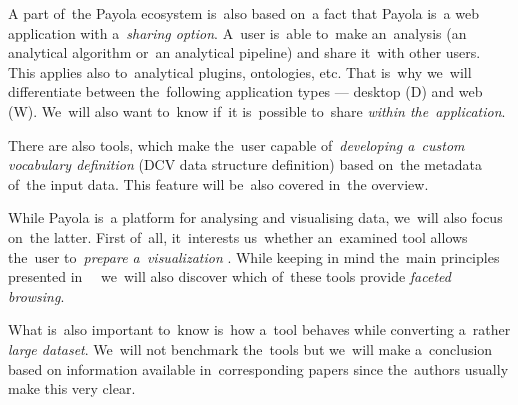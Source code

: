 A part of~the Payola ecosystem is~also based on~a fact that Payola is~a web 
application with a~\emph{sharing option}. A~user is~able to~make an~analysis (an
analytical algorithm or~an analytical pipeline) and share it~with other users. This applies also to~analytical plugins, ontologies, etc. That is~why we~will differentiate between the~following
application types --- desktop (D) and web (W). We~will also want to~know if~it is~possible to~share \emph{within the~application}.

There are also tools, which make the~user capable of~\emph{developing a~custom vocabulary 
definition} (DCV data structure definition) based on~the metadata of~the input data.
This feature will be~also covered in~the overview.

While Payola is~a platform for analysing and visualising data, we~will also 
focus on~the latter. First of~all, it~interests us~whether 
an~examined tool allows the~user to~\emph{prepare a~visualization} . While keeping 
in mind the~main principles presented in~~\cite{mantra} we~will also discover 
which of~these tools provide \emph{faceted browsing}.

What is~also important to~know is~how a~tool behaves while converting a~rather 
\emph{large dataset}. We~will not benchmark the~tools but we~will make a~conclusion based 
on information available in~corresponding papers since the~authors usually make 
this very clear.

\vspace{0.5cm}

